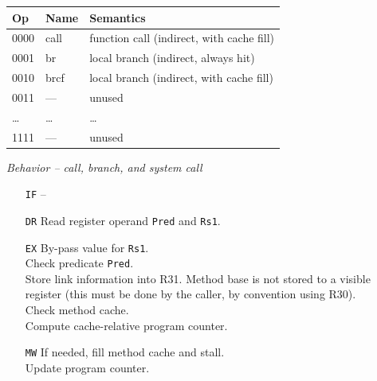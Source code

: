 \documentclass{IEEEtran}
\begin{document}
\begin{tabular}{lll}
  Op & Name  & Semantics \\ \hline
  0000 & call  & function call (indirect, with cache fill) \\
  0001 & br    & local branch (indirect, always hit) \\
  0010 & brcf  & local branch (indirect, with cache fill) \\
  0011 & ---   & unused \\
  \dots& \dots  & \dots \\
  1111 & ---   & unused \\ \hline
\end{tabular}

\vspace{7mm}
\emph{Behavior -- call, branch, and system call}

\begin{itemize}
  \item[\texttt{IF}] --
  \item[\texttt{DR}] Read register operand \texttt{Pred} and \texttt{Rs1}.
  \item[\texttt{EX}] By-pass value for \texttt{Rs1}. \\
                     Check predicate \texttt{Pred}. \\
		     Store link information into R31. Method base
		     is not stored to a visible register (this must be done by the caller, by convention using R30). \\
                     Check method cache. \\
                     Compute cache-relative program counter.
  \item[\texttt{MW}] If needed, fill method cache and stall. \\
                     Update program counter.
\end{itemize}
\end{document}
